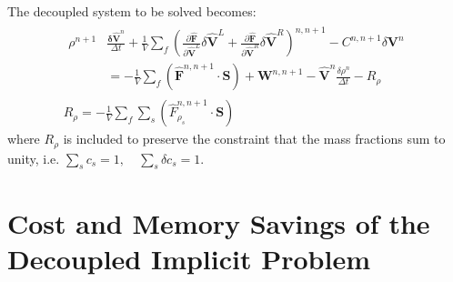 \documentclass[]{aiaa-tc}%
\begin{document}
%
The decoupled system to be solved becomes:
%
\begin{gather}
	\begin{split}
	\rho^{n+1}&\frac{\mathbf{\delta \hat{V}}^n}{\Delta t}+\frac{1}{V}\sum\limits_{f}(\frac{\partial \mathbf{\hat{F}}}{\partial \mathbf{\hat{V}}^L}\delta 	\mathbf{\hat{V}}^L +\frac{\partial \mathbf{\hat{F}}}{\partial \mathbf{\hat{V}}^R}\delta \mathbf{\hat{V}}^R)^{n, n+1}
	- C^{n, n+1}\delta\mathbf{V}^n \\
	&= -\frac{1}{V}\sum\limits_{f}(\mathbf{\hat{F}}^{n,n+1}\cdot\mathbf{S}) + \mathbf{W}^{n, n+1}
	-\mathbf{\hat{V}}^n\frac{\delta \rho^n}{\Delta t} - R_\rho
	\end{split} \\
 	R_\rho = -\frac{1}{V}\sum\limits_{f}{\sum\limits_{s}{(\hat{F}_{\rho_s}^{n,n+1}\cdot\mathbf{S})}}
\end {gather}
%
where $R_\rho$ is included to preserve the constraint that the mass fractions sum to unity, i.e. 
$\sum\limits_{s}{c_s}=1, \quad \sum\limits_{s}{\delta c_s}=1$.

\section{Cost and Memory Savings of the Decoupled Implicit Problem}
\end{document}
